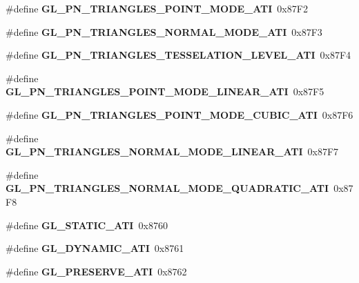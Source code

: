 \begin{DoxyCompactItemize}
\item 
\#define {\bfseries G\+L\+\_\+\+P\+N\+\_\+\+T\+R\+I\+A\+N\+G\+L\+E\+S\+\_\+\+P\+O\+I\+N\+T\+\_\+\+M\+O\+D\+E\+\_\+\+A\+T\+I}~0x87\+F2\label{_s_d_l__opengl_8h_a3f8de3283a47109fb9469341ddcd6c95}

\item 
\#define {\bfseries G\+L\+\_\+\+P\+N\+\_\+\+T\+R\+I\+A\+N\+G\+L\+E\+S\+\_\+\+N\+O\+R\+M\+A\+L\+\_\+\+M\+O\+D\+E\+\_\+\+A\+T\+I}~0x87\+F3\label{_s_d_l__opengl_8h_ae81bc10b86fbabe8cea302e0420d4124}

\item 
\#define {\bfseries G\+L\+\_\+\+P\+N\+\_\+\+T\+R\+I\+A\+N\+G\+L\+E\+S\+\_\+\+T\+E\+S\+S\+E\+L\+A\+T\+I\+O\+N\+\_\+\+L\+E\+V\+E\+L\+\_\+\+A\+T\+I}~0x87\+F4\label{_s_d_l__opengl_8h_aebe2311d500628e30bd79931ae4f4b2a}

\item 
\#define {\bfseries G\+L\+\_\+\+P\+N\+\_\+\+T\+R\+I\+A\+N\+G\+L\+E\+S\+\_\+\+P\+O\+I\+N\+T\+\_\+\+M\+O\+D\+E\+\_\+\+L\+I\+N\+E\+A\+R\+\_\+\+A\+T\+I}~0x87\+F5\label{_s_d_l__opengl_8h_a1f596fc0cb18f57d45c8eb519ce91455}

\item 
\#define {\bfseries G\+L\+\_\+\+P\+N\+\_\+\+T\+R\+I\+A\+N\+G\+L\+E\+S\+\_\+\+P\+O\+I\+N\+T\+\_\+\+M\+O\+D\+E\+\_\+\+C\+U\+B\+I\+C\+\_\+\+A\+T\+I}~0x87\+F6\label{_s_d_l__opengl_8h_ac5bbaf200b7029e667e3aa9766935be9}

\item 
\#define {\bfseries G\+L\+\_\+\+P\+N\+\_\+\+T\+R\+I\+A\+N\+G\+L\+E\+S\+\_\+\+N\+O\+R\+M\+A\+L\+\_\+\+M\+O\+D\+E\+\_\+\+L\+I\+N\+E\+A\+R\+\_\+\+A\+T\+I}~0x87\+F7\label{_s_d_l__opengl_8h_a1786c898dc9e78d8892f1287804a819a}

\item 
\#define {\bfseries G\+L\+\_\+\+P\+N\+\_\+\+T\+R\+I\+A\+N\+G\+L\+E\+S\+\_\+\+N\+O\+R\+M\+A\+L\+\_\+\+M\+O\+D\+E\+\_\+\+Q\+U\+A\+D\+R\+A\+T\+I\+C\+\_\+\+A\+T\+I}~0x87\+F8\label{_s_d_l__opengl_8h_a19cc33e316ba0774bb83b5a595eeda96}

\item 
\#define {\bfseries G\+L\+\_\+\+S\+T\+A\+T\+I\+C\+\_\+\+A\+T\+I}~0x8760\label{_s_d_l__opengl_8h_ae0a0d28ca09a0aa2f41d8eafb0a1651a}

\item 
\#define {\bfseries G\+L\+\_\+\+D\+Y\+N\+A\+M\+I\+C\+\_\+\+A\+T\+I}~0x8761\label{_s_d_l__opengl_8h_a8685b152c484ad0c1730a16f114691de}

\item 
\#define {\bfseries G\+L\+\_\+\+P\+R\+E\+S\+E\+R\+V\+E\+\_\+\+A\+T\+I}~0x8762\label{_s_d_l__opengl_8h_ac3931a18d55a4b1cb50ff8219ef6be6a}


\end{DoxyCompactItemize}
